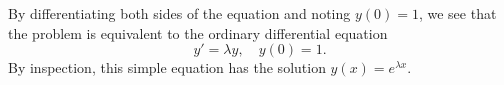 \documentclass{homework}
\begin{document}
\begin{solution}
  By differentiating both sides of the equation and noting $y(0) = 1$, we see that the problem is equivalent to the ordinary differential equation
  $$
    y' = \lambda y,\quad y(0) = 1.
  $$
  By inspection, this simple equation has the solution $y(x) = e^{\lambda x}$.
\end{solution}
\end{document}

